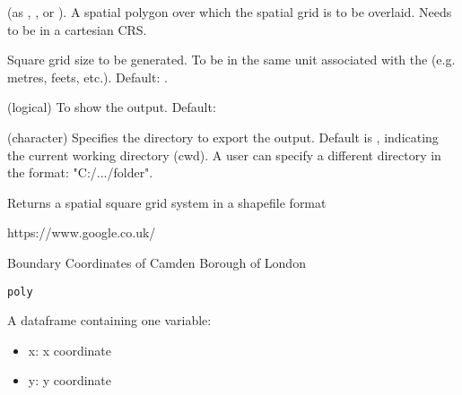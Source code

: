 \documentclass[a4paper]{book}
\begin{document}
%
\begin{Arguments}
\begin{ldescription}
\item[\code{poly}] (as , , or
). A spatial polygon over
which the spatial grid is to be overlaid. Needs to be in a
cartesian CRS.

\item[\code{size}] Square grid size to be generated.
To be in the same unit associated with the  (e.g.
metres, feets, etc.). Default: .

\item[\code{show.output}] (logical) To show the output.
Default: 

\item[\code{dir}] (character) Specifies the directory to
export the output. Default is , indicating the
current working directory (cwd). A user can specify a different
directory in the format: "C:/.../folder".
\end{ldescription}
\end{Arguments}
%
\begin{Value}
Returns a spatial square grid system
in a shapefile format
\end{Value}
%
\begin{References}\relax
https://www.google.co.uk/
\end{References}
%
\begin{Description}\relax
Boundary Coordinates of Camden Borough of London
\end{Description}
%
\begin{Usage}
\begin{verbatim}
poly
\end{verbatim}
\end{Usage}
%
\begin{Format}
A dataframe containing one variable:
\begin{itemize}

\item{} x: x coordinate
\item{} y: y coordinate

\end{itemize}

\end{Format}
\end{document}
